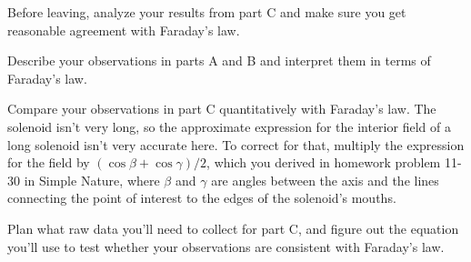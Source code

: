\selfcheck

Before leaving, analyze your results from part C and make
sure you get reasonable agreement with Faraday's law.

\analysis

Describe your observations in parts A and B and interpret
them in terms of Faraday's law.

Compare your observations in part C quantitatively with Faraday's law.
The solenoid isn't very long, so the approximate expression for the
interior field of a long solenoid isn't very accurate here. To correct
for that, multiply the expression for the field by $(\cos\beta+\cos\gamma)/2$,
which you derived in homework problem 11-30 in Simple Nature, where
$\beta$ and $\gamma$ are angles between the axis and the lines connecting
the point of interest to the edges of the solenoid's mouths.

\prelab

\prelabquestion  Plan what raw data you'll need to collect for part C,
and figure out the equation you'll use to test whether your
observations are consistent with Faraday's law.
